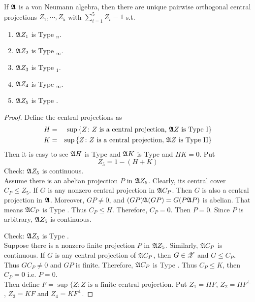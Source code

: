 \begin{thm}
	If $\mathfrak{A}$ is a von Neumann algebra, then there are unique pairwise orthogonal central projections $Z_1,\cdots,Z_5$ with $\sum_{i=1}^5 Z_i = 1$ s.t.
	\begin{enumerate}[label = \arabic*)]
		\item $\mathfrak{A} Z_1$ is Type $_n$.
		\item $\mathfrak{A} Z_2$ is Type $_{\infty}$.
		\item $\mathfrak{A} Z_3$ is Type $_1$.
		\item $\mathfrak{A} Z_4$ is Type $_{\infty}$.
		\item $\mathfrak{A} Z_5$ is Type . 
	\end{enumerate}
\end{thm}
\begin{proof}
	Define the central projections as
	\begin{eqnarray*}
		H &=& \sup{\{Z \colon Z \text{ is a central projection, } \A Z \text{ is Type \RNum{1}} \}} \\
		K &=& \sup{\{Z \colon Z \text{ is a central projection, } \A Z \text{ is Type \RNum{2}} \}}
	\end{eqnarray*}
	Then it is easy to see $\mathfrak{A} H$ is Type  and $\mathfrak{A} K$ is Type  and $HK=0$. Put
	\begin{equation*}
		Z_5 = 1 - (H + K)
	\end{equation*}
	Check: $\mathfrak{A} Z_5$ is continuous. \\
	Assume there is an abelian projection $P$ in $\mathfrak{A} Z_5$. Clearly, its central cover $C_P \leqslant Z_5$. If $G$ is any nonzero central projection in $\mathfrak{A} C_P$. Then $G$ is also a central projection in $\mathfrak{A}$. Moreover, $GP \neq 0$, and $(GP)\mathfrak{A} (GP) = G(P\mathfrak{A} P)$ is abelian. That means $\mathfrak{A} C_P$ is Type . Thus $C_P \leqslant H$. Therefore, $C_P = 0$. Then $P = 0$. Since $P$ is arbitrary, $\mathfrak{A} Z_5$ is continuous.
	\item Check: $\mathfrak{A} Z_5$ is Type . \\
	Suppose there is a nonzero finite projection $P$ in $\mathfrak{A} Z_5$. Similarly, $\mathfrak{A} C_P$ is continuous. If $G$ is any central projection of $\mathfrak{A} C_P$, then $G \in \mathscr{Z}$ and $G \leqslant C_P$. Thus $GC_P \neq 0$ and $GP$ is finite. Therefore, $\mathfrak{A} C_P$ is Type . Thus $C_P \leqslant K$, then $C_P = 0$ i.e. $P=0$.\\
	Then define $F = \sup{\{Z \colon Z \text{ is a finite central projection}}$. Put $Z_1 = HF$, $Z_2 = HF^{\bot}$, $Z_3 = KF$ and $Z_4 = KF^{\bot}$.
\end{proof}

